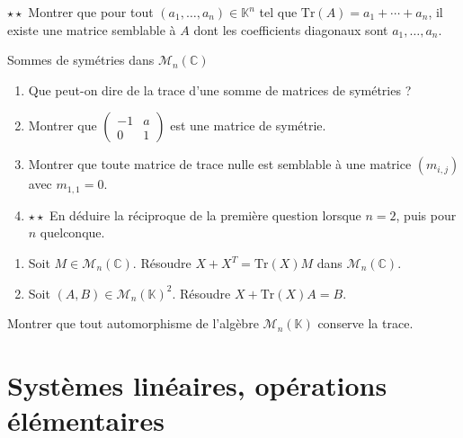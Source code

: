 \documentclass[french,a4paper]{article}
\newcommand{\C}{\mathbb{C}}
\newcommand{\K}{\mathbb{K}}
\newcommand{\Tr}{\text{Tr}}
\theoremstyle{plain}
\theoremstyle{definition}
\theoremstyle{remark}
\begin{document}
\begin{ex}{$\star\star$}
	Montrer que pour tout $(a_1,\ldots,a_n)\in\K^n$ tel que $\Tr(A)=a_1+\cdots+a_n$, il existe une matrice semblable à $A$ dont les coefficients diagonaux sont $a_1,\ldots,a_n$.
\end{ex}

\begin{ex}{Sommes de symétries dans $\mathcal{M}_n(\C)$}
	\begin{enumerate}
		\item Que peut-on dire de la trace d'une somme de matrices de symétries ?
		\item Montrer que $\displaystyle\begin{pmatrix}
			-1&a\\
			0&1
		\end{pmatrix}$ est une matrice de symétrie.
		\item Montrer que toute matrice de trace nulle est semblable à une matrice $(m_{i,j})$ avec $m_{1,1}=0$.
		\item $\star\star$ En déduire la réciproque de la première question lorsque $n=2$, puis pour $n$ quelconque.
	\end{enumerate}
\end{ex}

\begin{ex}{}
	\begin{enumerate}
		\item Soit $M\in\mathcal{M}_n(\C)$. Résoudre $X+X^T=\Tr(X)M$ dans $\mathcal{M}_n(\C)$.
		\item Soit $(A,B)\in\mathcal{M}_n(\K)^2$. Résoudre $X+\Tr(X)A=B$.
	\end{enumerate}
\end{ex}

\begin{ex}{}
	Montrer que tout automorphisme de l'algèbre $\mathcal{M}_n(\K)$ conserve la trace.
\end{ex}

\section{Systèmes linéaires, opérations élémentaires}
\end{document}
